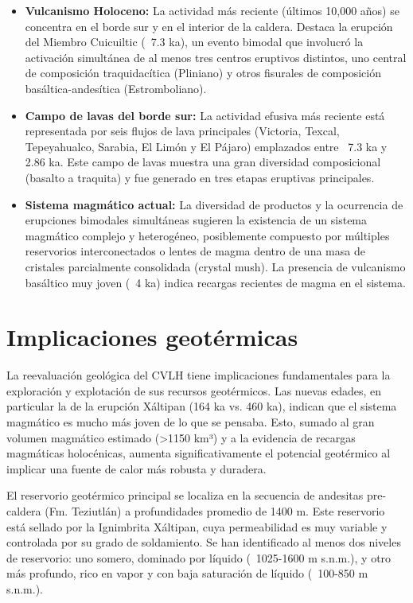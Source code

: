 \begin{itemize}
    \item \textbf{Vulcanismo Holoceno:} La actividad más reciente (últimos 10,000 años) se concentra en el borde sur y en el interior de la caldera. Destaca la erupción del Miembro Cuicuiltic (~7.3 ka), un evento bimodal que involucró la activación simultánea de al menos tres centros eruptivos distintos, uno central de composición traquidacítica (Pliniano) y otros fisurales de composición basáltica-andesítica (Estromboliano).
    \item \textbf{Campo de lavas del borde sur:}  La actividad efusiva más reciente está representada por seis flujos de lava principales (Victoria, Texcal, Tepeyahualco, Sarabia, El Limón y El Pájaro) emplazados entre ~7.3 ka y 2.86 ka. Este campo de lavas muestra una gran diversidad composicional (basalto a traquita) y fue generado en tres etapas eruptivas principales.
    \item \textbf{Sistema magmático actual:} La diversidad de productos y la ocurrencia de erupciones bimodales simultáneas sugieren la existencia de un sistema magmático complejo y heterogéneo, posiblemente compuesto por múltiples reservorios interconectados o lentes de magma dentro de una masa de cristales parcialmente consolidada (crystal mush). La presencia de vulcanismo basáltico muy joven (~4 ka) indica recargas recientes de magma en el sistema.
\end{itemize}

\section{Implicaciones geotérmicas}
La reevaluación geológica del CVLH tiene implicaciones fundamentales para la exploración y explotación de sus recursos geotérmicos. Las nuevas edades, en particular la de la erupción Xáltipan (164 ka vs. 460 ka), indican que el sistema magmático es mucho más joven de lo que se pensaba. Esto, sumado al gran volumen magmático estimado (>1150 km³) y a la evidencia de recargas magmáticas holocénicas, aumenta significativamente el potencial geotérmico al implicar una fuente de calor más robusta y duradera.

El reservorio geotérmico principal se localiza en la secuencia de andesitas pre-caldera (Fm. Teziutlán) a profundidades promedio de 1400 m. Este reservorio está sellado por la Ignimbrita Xáltipan, cuya permeabilidad es muy variable y controlada por su grado de soldamiento. Se han identificado al menos dos niveles de reservorio: uno somero, dominado por líquido (~1025-1600 m s.n.m.), y otro más profundo, rico en vapor y con baja saturación de líquido (~100-850 m s.n.m.).

